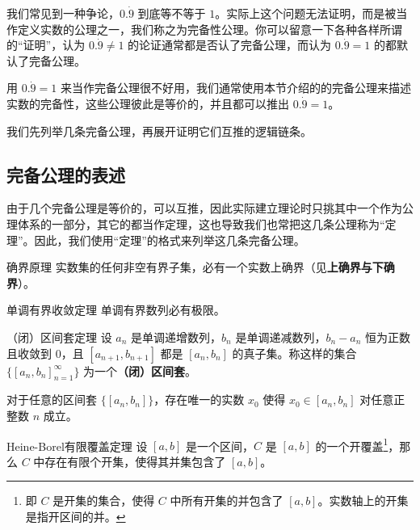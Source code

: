 


我们常见到一种争论，$0.\dot{9}$ 到底等不等于 $1$。实际上这个问题无法证明，而是被当作定义实数的公理之一，我们称之为完备性公理。你可以留意一下各种各样所谓的“证明”，认为 $0.\dot{9}\neq 1$ 的论证通常都是否认了完备公理，而认为 $0.\dot{9}=1$ 的都默认了完备公理。

用 $0.\dot{9}=1$ 来当作完备公理很不好用，我们通常使用本节介绍的的完备公理来描述实数的完备性，这些公理彼此是等价的，并且都可以推出 $0.\dot{9}=1$。

我们先列举几条完备公理，再展开证明它们互推的逻辑链条。

\subsection{完备公理的表述}

由于几个完备公理是等价的，可以互推，因此实际建立理论时只挑其中一个作为公理体系的一部分，其它的都当作定理，这也导致我们也常把这几条公理称为“定理”。因此，我们使用“定理”的格式来列举这几条完备公理。

\begin{theorem}{确界原理}\label{the_RCompl_1}
实数集的任何非空有界子集，必有一个实数上确界（见\textbf{上确界与下确界}）。
\end{theorem}

\begin{theorem}{单调有界收敛定理}\label{the_RCompl_2}
单调有界数列必有极限。
\end{theorem}

\begin{theorem}{（闭）区间套定理}\label{the_RCompl_3}
设 $a_n$ 是单调递增数列，$b_n$ 是单调递减数列，$b_n-a_n$ 恒为正数且收敛到 $0$，且 $[a_{n+1}, b_{n+1}]$ 都是 $[a_n, b_n]$ 的真子集。称这样的集合 $\{[a_n, b_n]_{n=1}^\infty\}$ 为一个\textbf{（闭）区间套}。

对于任意的区间套 $\{[a_n, b_n]\}$，存在唯一的实数 $x_0$ 使得 $x_0\in [a_n, b_n]$ 对任意正整数 $n$ 成立。
\end{theorem}

\begin{theorem}{Heine-Borel有限覆盖定理}\label{the_RCompl_4}
设 $[a, b]$ 是一个区间，$C$ 是 $[a, b]$ 的一个开覆盖\footnote{即 $C$ 是开集的集合，使得 $C$ 中所有开集的并包含了 $[a, b]$。实数轴上的开集是指开区间的并。}，那么 $C$ 中存在有限个开集，使得其并集包含了 $[a, b]$。
\end{theorem}

